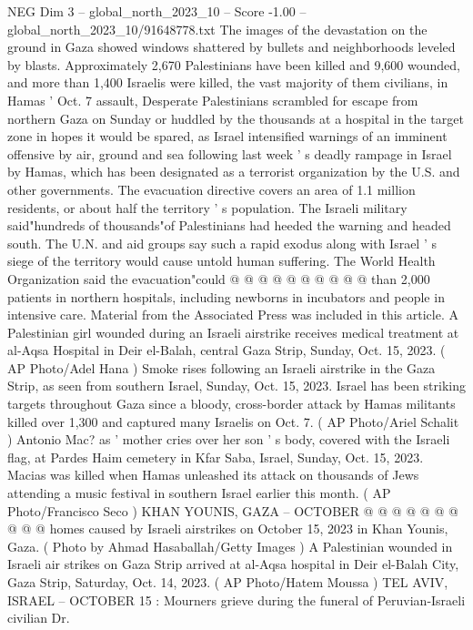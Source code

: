 \begin{textsample}{NEG Dim 3 – global\_north\_2023\_10 – Score -1.00 – global\_north\_2023\_10/91648778.txt}  \label{ex:f3_neg_256}
The images of the devastation on the ground in Gaza showed windows shattered by bullets and neighborhoods leveled by blasts.
Approximately 2,670 Palestinians have been killed and 9,600 wounded, and more than 1,400 Israelis were killed, the vast majority of them civilians, in Hamas ' Oct. 7 assault, Desperate Palestinians scrambled for escape from northern Gaza on Sunday or huddled by the thousands at a hospital in the target zone in hopes it would be spared, as Israel intensified warnings of an imminent offensive by air, ground and sea following last week ' s deadly rampage in Israel by Hamas, which has been designated as a terrorist organization by the U.S. and other governments.
The evacuation directive covers an area of 1.1 million residents, or about half the territory ' s population.
The Israeli military said"hundreds of thousands"of Palestinians had heeded the warning and headed south.
The U.N. and aid groups say such a rapid exodus along with Israel ' s siege of the territory would cause untold human suffering.
The World Health Organization said the evacuation"could @ @ @ @ @ @ @ @ @ @ than 2,000 patients in northern hospitals, including newborns in incubators and people in intensive care.
Material from the Associated Press was included in this article.
A Palestinian girl wounded during an Israeli airstrike receives medical treatment at al-Aqsa Hospital in Deir el-Balah, central Gaza Strip, Sunday, Oct. 15, 2023. ( AP Photo/Adel Hana ) Smoke rises following an Israeli airstrike in the Gaza Strip, as seen from southern Israel, Sunday, Oct. 15, 2023.
Israel has been striking targets throughout Gaza since a bloody, cross-border attack by Hamas militants killed over 1,300 and captured many Israelis on Oct. 7. ( AP Photo/Ariel Schalit ) Antonio Mac? as ' mother cries over her son ' s body, covered with the Israeli flag, at Pardes Haim cemetery in Kfar Saba, Israel, Sunday, Oct. 15, 2023.
Macias was killed when Hamas unleashed its attack on thousands of Jews attending a music festival in southern Israel earlier this month. ( AP Photo/Francisco Seco ) KHAN YOUNIS, GAZA -- OCTOBER @ @ @ @ @ @ @ @ @ @ homes caused by Israeli airstrikes on October 15, 2023 in Khan Younis, Gaza. ( Photo by Ahmad Hasaballah/Getty Images ) A Palestinian wounded in Israeli air strikes on Gaza Strip arrived at al-Aqsa hospital in Deir el-Balah City, Gaza Strip, Saturday, Oct. 14, 2023. ( AP Photo/Hatem Moussa ) TEL AVIV, ISRAEL -- OCTOBER 15 : Mourners grieve during the funeral of Peruvian-Israeli civilian Dr.

\end{textsample}
